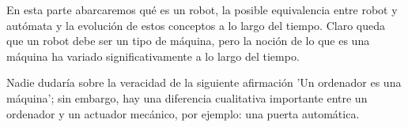 En esta parte abarcaremos qué es un robot, la posible equivalencia entre robot y autómata y la evolución de estos conceptos a lo largo del tiempo. Claro queda que un robot debe ser un tipo de máquina, pero la noción de lo que es una máquina ha variado significativamente a lo largo del tiempo.

\vspace{10px}

Nadie dudaría sobre la veracidad de la siguiente afirmación 'Un ordenador es una máquina'; sin embargo, hay una diferencia cualitativa importante entre un ordenador y un actuador mecánico, por ejemplo: una puerta automática.


\vspace{10px}
